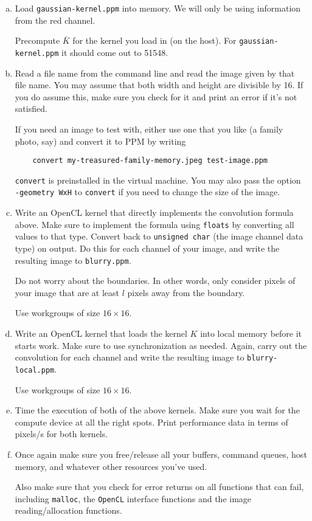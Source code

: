 \documentclass[11pt]{article}
\begin{document}
\begin{enumerate}[a)]
  \item Load \texttt{gaussian-kernel.ppm} into memory. We will only be
    using information from the red channel.

    Precompute $\bar K$ for the kernel you load in (on the host). For
    \texttt{gaussian-kernel.ppm} it should come out to 51548.

  \item Read a file name from the command line and read the image
    given by that file name. You may assume that both width and height
    are divisible by 16. If you do assume this, make sure you check
    for it and print an error if it's not satisfied.

    If you need an image to test with, either use one that you like (a
    family photo, say) and convert it to PPM by writing
    \begin{lstlisting}
    convert my-treasured-family-memory.jpeg test-image.ppm
    \end{lstlisting}
    \texttt{convert} is preinstalled in the virtual machine. You may
    also pass the option \texttt{-geometry WxH} to \texttt{convert}
    if you need to change the size of the image.
  \item Write an OpenCL kernel that directly implements the
    convolution formula above. Make sure to implement the formula
    using \texttt{floats} by converting all values to that type.
    Convert back to \texttt{unsigned char} (the image channel data
    type) on output. Do this for each channel of your image,
    and write the resulting image to \texttt{blurry.ppm}.

    Do not worry about the boundaries. In other words, only consider
    pixels of your image that are at least $l$ pixels away from the
    boundary.

    Use workgroups of size $16\times 16$.
  \item Write an OpenCL kernel that loads the kernel $K$ into local
    memory before it starts work. Make sure to use synchronization as
    needed. Again, carry out the convolution for each channel 
    and write the resulting image to \texttt{blurry-local.ppm}.

    Use workgroups of size $16\times 16$.

  \item Time the execution of both of the above kernels. Make sure you
    wait for the compute device at all the right spots. Print
    performance data in terms of pixels/s for both kernels.
  \item Once again make sure you free/release all your buffers,
    command queues, host memory, and whatever other resources you've
    used.

    Also make sure that you check for error returns on all functions
    that can fail, including \texttt{malloc}, the \texttt{OpenCL}
    interface functions and the image reading/allocation functions.
\end{enumerate}
\end{document}
